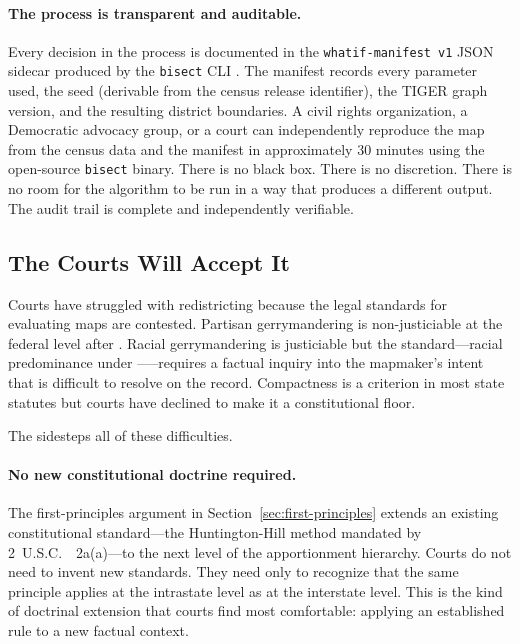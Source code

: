 \paragraph{The process is transparent and auditable.}
Every decision in the \ar{} process is documented in the \texttt{whatif-manifest
v1} JSON sidecar produced by the \texttt{bisect} CLI \citep{b0paper}.
The manifest records every parameter used, the seed (derivable from the
census release identifier), the TIGER graph version, and the resulting
district boundaries.
A civil rights organization, a Democratic advocacy group, or a court
can independently reproduce the map from the census data and the
manifest in approximately 30 minutes using the open-source \texttt{bisect}
binary.
There is no black box.
There is no discretion.
There is no room for the algorithm to be run in a way that produces a
different output.
The audit trail is complete and independently verifiable.

\subsection{The Courts Will Accept It}

Courts have struggled with redistricting because the legal standards for
evaluating maps are contested.
Partisan gerrymandering is non-justiciable at the federal level after \rucho{}.
Racial gerrymandering is justiciable but the standard---racial predominance
under \shaw{}--\miller{}---requires a factual inquiry into the mapmaker's
intent that is difficult to resolve on the record.
Compactness is a criterion in most state statutes but courts have declined
to make it a constitutional floor.

The \dia{} sidesteps all of these difficulties.

\paragraph{No new constitutional doctrine required.}
The first-principles argument in Section~\ref{sec:first-principles} extends
an existing constitutional standard---the Huntington-Hill method mandated by
2~U.S.C.~\usca{}~2a(a)---to the next level of the apportionment hierarchy.
Courts do not need to invent new standards.
They need only to recognize that the same principle applies at the intrastate
level as at the interstate level.
This is the kind of doctrinal extension that courts find most comfortable:
applying an established rule to a new factual context.

